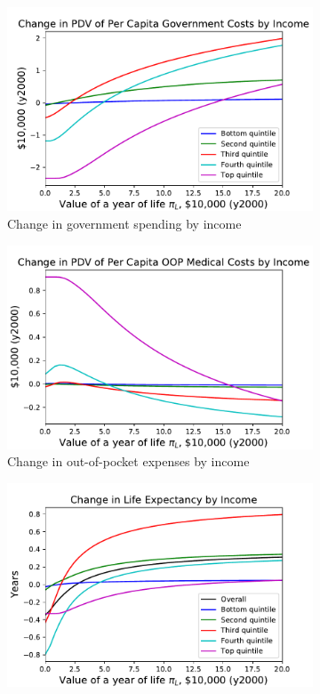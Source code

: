\documentclass[12pt,pdftex,letterpaper]{article}
\begin{document}
\begin{figure}[h!]
\begin{subfigure}[b]{0.49\textwidth}
        \includegraphics[width=\textwidth]{../Figures/SocOptByLifePriceGovtChangeByInc.pdf}
        \caption{Change in government spending by income}
    \end{subfigure}
    \begin{subfigure}[b]{0.49\textwidth}
        \centering
        \includegraphics[width=\textwidth]{../Figures/SocOptByLifePriceOOPchangeByInc.pdf}
        \caption{Change in out-of-pocket expenses by income}
    \end{subfigure}
    \begin{subfigure}[b]{0.49\textwidth}
        \centering
        \includegraphics[width=\textwidth]{../Figures/SocOptByLifePriceLifeExp.pdf}

\end{subfigure}
\end{figure}
\end{document}

